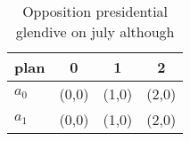 \documentclass[a4paper]{article}
\begin{document}
\begin{table}
\begin{adjustbox}{width=0.6\columnwidth}
\begin{tabular}{|l|l|l|l|}
\hline
\textbf{plan} & \multicolumn{1}{c|}{\textbf{0}} & \multicolumn{1}{c|}{\textbf{1}} & \multicolumn{1}{c|}{\textbf{2}} \\ \hline
\textbf{$a_0$}  & (0,0) & (1,0) & (2,0) \\ \hline
\textbf{$a_1$}  & (0,0) & (1,0) & (2,0) \\ \hline
\end{tabular}
\end{adjustbox}
\caption{Opposition presidential glendive on july although
}
\end{table}
\end{document}
